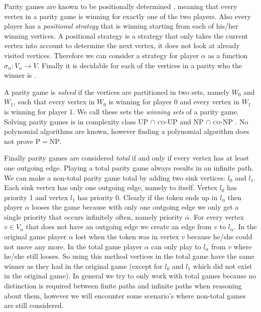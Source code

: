 Parity games are known to be positionally determined \cite{Bradfield2018}, meaning that every vertex in a parity game is winning for exactly one of the two players. Also every player has a \textit{positional strategy} that is winning starting from each of his/her winning vertices. A positional strategy is a strategy that only takes the current vertex into account to determine the next vertex, it does not look at already visited vertices. Therefore we can consider a strategy for player $\alpha$ as a function $\sigma_\alpha : V_\alpha \rightarrow V$. Finally it is decidable for each of the vertices in a parity who the winner is \cite{Bradfield2018}.

A parity game is \textit{solved} if the vertices are partitioned in two sets, namely $W_0$ and $W_1$, such that every vertex in $W_0$ is winning for player 0 and every vertex in $W_1$ is winning for player 1. We call these sets the \textit{winning sets} of a parity game. Solving parity games is in complexity class \textsc{UP} $\cap$ \textsc{co-UP} and \textsc{NP} $\cap$ \textsc{co-NP} \cite{JURDZINSKI_complexity_1998119}. No polynomial algorithms are known, however finding a polynomial algorithm does not prove \textsc{P$=$NP}.

Finally parity games are considered \textit{total} if and only if every vertex has at least one outgoing edge. Playing a total parity game always results in an infinite path. We can make a non-total parity game total by adding two sink vertices: $l_0$ and $l_1$. Each sink vertex has only one outgoing edge, namely to itself. Vertex $l_0$ has priority 1 and vertex $l_1$ has priority 0. Clearly if the token ends up in $l_\alpha$ then player $\alpha$ looses the game because with only one outgoing edge we only get a single priority that occurs infinitely often, namely priority $\overline{\alpha}$. For every vertex $v \in V_\alpha$ that does not have an outgoing edge we create an edge from $v$ to $l_\alpha$. In the original game player $\alpha$ lost when the token was in vertex $v$ because he/she could not move any more. In the total game player $\alpha$ can only play to $l_\alpha$ from $v$ where he/she still looses. So using this method vertices in the total game have the same winner as they had in the original game (except for $l_0$ and $l_1$ which did not exist in the original game). In general we try to only work with total games because no distinction is required between finite paths and infinite paths when reasoning about them, however we will encounter some scenario's where non-total games are still considered.


